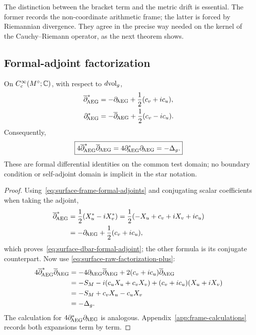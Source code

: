 The distinction between the bracket term and the metric drift is essential.  The
former records the non-coordinate arithmetic frame; the latter is forced by
Riemannian divergence.  They agree in the precise way needed on the kernel of the
Cauchy--Riemann operator, as the next theorem shows.

\subsection{Formal-adjoint factorization}

\begin{theorem}
\label{thm:surface-adjoint-factorization}
On $C_c^\infty(M^\circ;\mathbb{C})$, with respect to $d\mathrm{vol}_g$,
\begin{align}
 \overline\partial_{\!\mathrm{AEG}}^*
 &=-\partial_{\!\mathrm{AEG}}+\frac12(c_v+ic_u),
 \label{eq:surface-dbar-formal-adjoint}\\
 \partial_{\!\mathrm{AEG}}^*
 &=-\overline\partial_{\!\mathrm{AEG}}+\frac12(c_v-ic_u).
 \label{eq:surface-d-formal-adjoint}
\end{align}
Consequently,
\begin{equation}\label{eq:surface-adjoint-factorization}
 \boxed{
 4\overline\partial_{\!\mathrm{AEG}}^*\overline\partial_{\!\mathrm{AEG}}
 =4\partial_{\!\mathrm{AEG}}^*\partial_{\!\mathrm{AEG}}
 =-\Delta_g.
 }
\end{equation}
These are formal differential identities on the common test domain; no boundary
condition or self-adjoint domain is implicit in the star notation.
\end{theorem}

\begin{proof}
Using~\eqref{eq:surface-frame-formal-adjoints} and conjugating scalar
coefficients when taking the adjoint,
\begin{align*}
 \overline\partial_{\!\mathrm{AEG}}^*
 &=\frac12(X_u^*-iX_v^*)
   =\frac12(-X_u+c_v+iX_v+ic_u)\\
 &=-\partial_{\!\mathrm{AEG}}+\frac12(c_v+ic_u),
\end{align*}
which proves~\eqref{eq:surface-dbar-formal-adjoint}; the other formula is its
conjugate counterpart.  Now use
\eqref{eq:surface-raw-factorization-plus}:
\begin{align*}
 4\overline\partial_{\!\mathrm{AEG}}^*\overline\partial_{\!\mathrm{AEG}}
 &=-4\partial_{\!\mathrm{AEG}}\overline\partial_{\!\mathrm{AEG}}
   +2(c_v+ic_u)\overline\partial_{\!\mathrm{AEG}}\\
 &=-S_M-i(c_uX_u+c_vX_v)
   +(c_v+ic_u)(X_u+iX_v)\\
 &=-S_M+c_vX_u-c_uX_v\\
 &=-\Delta_g.
\end{align*}
The calculation for $4\partial_{\!\mathrm{AEG}}^*\partial_{\!\mathrm{AEG}}$ is analogous.
Appendix~\ref{app:frame-calculations} records both expansions term by term.
\end{proof}

